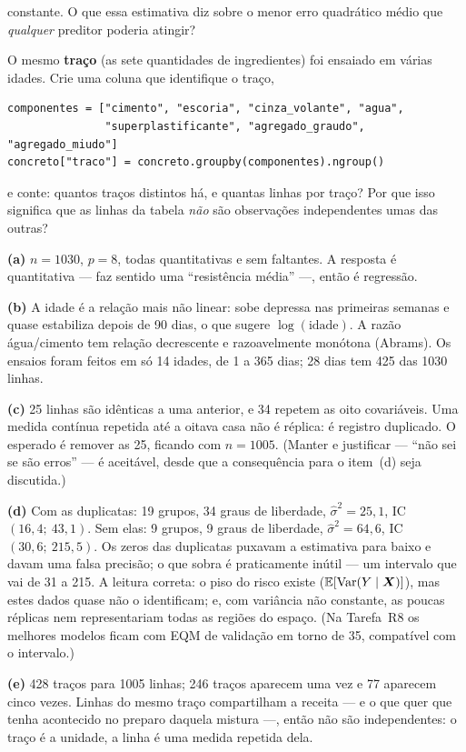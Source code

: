 \documentclass[11pt,a4paper]{article}
\begin{document}
\begin{itens}
        constante. O que essa estimativa diz sobre o menor erro quadrático médio que
        \emph{qualquer} preditor poderia atingir?
  \item O mesmo \textbf{traço} (as sete quantidades de ingredientes) foi ensaiado em
        várias idades. Crie uma coluna que identifique o traço,
\begin{lstlisting}
componentes = ["cimento", "escoria", "cinza_volante", "agua",
               "superplastificante", "agregado_graudo", "agregado_miudo"]
concreto["traco"] = concreto.groupby(componentes).ngroup()
\end{lstlisting}
        e conte: quantos traços distintos há, e quantas linhas por traço? Por que
        isso significa que as linhas da tabela \emph{não} são observações
        independentes umas das outras?
\end{itens}

\begin{solucao}
\textbf{(a)} $n=1030$, $p=8$, todas quantitativas e sem faltantes. A resposta é
quantitativa --- faz sentido uma ``resistência média'' ---, então é regressão.

\textbf{(b)} A idade é a relação mais não linear: sobe depressa nas primeiras semanas e
quase estabiliza depois de 90 dias, o que sugere $\log(\text{idade})$. A razão
água/cimento tem relação decrescente e razoavelmente monótona (Abrams). Os ensaios
foram feitos em só 14 idades, de 1 a 365 dias; 28 dias tem 425 das 1030 linhas.

\textbf{(c)} 25 linhas são idênticas a uma anterior, e 34 repetem as oito
covariáveis. Uma medida contínua repetida até a oitava casa não é réplica: é registro
duplicado. O esperado é remover as 25, ficando com $n=1005$. (Manter e justificar ---
``não sei se são erros'' --- é aceitável, desde que a consequência para o item~(d) seja
discutida.)

\textbf{(d)} Com as duplicatas: 19 grupos, 34 graus de liberdade,
$\widehat\sigma^2=25{,}1$, IC~$(16{,}4;\ 43{,}1)$. Sem elas: 9 grupos, 9 graus de
liberdade, $\widehat\sigma^2=64{,}6$, IC~$(30{,}6;\ 215{,}5)$. Os zeros das duplicatas
puxavam a estimativa para baixo e davam uma falsa precisão; o que sobra é
praticamente inútil --- um intervalo que vai de 31 a 215. A leitura correta: o piso do
risco existe ($\mathbb{E}[\operatorname{Var}(Y\mid\bm{X})]$), mas estes dados quase não o identificam;
e, com variância não constante, as poucas réplicas nem representariam todas as regiões
do espaço. (Na Tarefa~R8 os melhores modelos ficam com EQM de validação em torno de
35, compatível com o intervalo.)

\textbf{(e)} 428 traços para 1005 linhas; 246 traços aparecem uma vez e 77 aparecem
cinco vezes. Linhas do mesmo traço compartilham a receita --- e o que quer que tenha
acontecido no preparo daquela mistura ---, então não são independentes: o traço é a
unidade, a linha é uma medida repetida dela.
\end{solucao}
\end{document}
